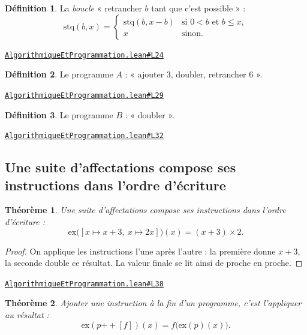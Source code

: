 \documentclass[11pt,a4paper]{article}
\theoremstyle{definition}
\newtheorem{definition}{Définition}
\theoremstyle{plain}
\newtheorem{theoreme}{Théorème}
\newcommand{\source}[2]{\par\smallskip\noindent\hfill{\footnotesize\href{#1}{\texttt{#2}}}\par\smallskip}
\begin{document}
\begin{definition}
La \emph{boucle} « retrancher $b$ tant que c'est possible » :
\[ \mathrm{stq}(b, x) =
   \begin{cases}
     \mathrm{stq}(b, x - b) & \text{si } 0 < b \text{ et } b \le x, \\
     x & \text{sinon.}
   \end{cases} \]
\end{definition}
\source{https://github.com/Commutator-IO/learn-lean/blob/main/courses/01-college/07-algorithmique-et-programmation/AlgorithmiqueEtProgrammation.lean\#L24}{AlgorithmiqueEtProgrammation.lean\#L24}

\begin{definition}
Le programme $A$ : « ajouter 3, doubler, retrancher 6 ».
\end{definition}
\source{https://github.com/Commutator-IO/learn-lean/blob/main/courses/01-college/07-algorithmique-et-programmation/AlgorithmiqueEtProgrammation.lean\#L29}{AlgorithmiqueEtProgrammation.lean\#L29}

\begin{definition}
Le programme $B$ : « doubler ».
\end{definition}
\source{https://github.com/Commutator-IO/learn-lean/blob/main/courses/01-college/07-algorithmique-et-programmation/AlgorithmiqueEtProgrammation.lean\#L32}{AlgorithmiqueEtProgrammation.lean\#L32}

\subsection{Une suite d'affectations compose ses instructions dans l'ordre d'écriture}

\begin{theoreme}
Une suite d'affectations compose ses instructions dans l'ordre d'écriture :
\[ \mathrm{ex}\bigl([x \mapsto x+3,\ x \mapsto 2x]\bigr)(x) = (x + 3) \times 2 . \]
\end{theoreme}

\begin{proof}
On applique les instructions l'une après l'autre : la première donne $x + 3$, la seconde
double ce résultat. La valeur finale se lit ainsi de proche en proche.
\end{proof}
\source{https://github.com/Commutator-IO/learn-lean/blob/main/courses/01-college/07-algorithmique-et-programmation/AlgorithmiqueEtProgrammation.lean\#L38}{AlgorithmiqueEtProgrammation.lean\#L38}

\begin{theoreme}
Ajouter une instruction à la fin d'un programme, c'est l'appliquer au résultat :
\[ \mathrm{ex}(p \mathbin{+\!\!+} [f])(x) = f\bigl(\mathrm{ex}(p)(x)\bigr) . \]
\end{theoreme}
\end{document}
